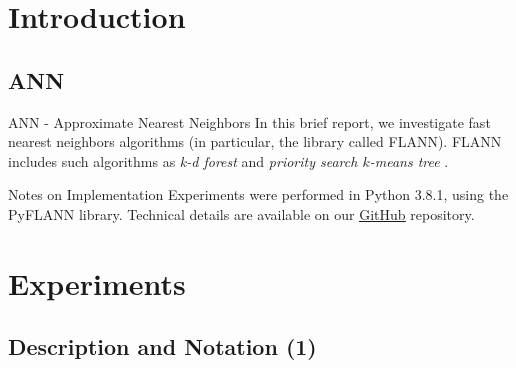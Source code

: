 \section{Introduction}
\subsection{ANN}

\begin{frame}
	
	\begin{block}{ANN - Approximate Nearest Neighbors}
		In this brief report, we investigate fast nearest neighbors algorithms (in particular, the library called FLANN). FLANN includes such algorithms as {\color{red} \textit{k-d forest}} and {\color{red} \textit{priority search $k$-means tree}} \cite{Muja2009}. 
	\end{block}
	
	\begin{block}{Notes on Implementation}
		Experiments were performed in Python 3.8.1, using the PyFLANN library. Technical details are available on our  \href{https://github.com/salisaresama/computer-vision/blob/flann-32k/flann.ipynb}{{\color{blue} \underline{GitHub}}} repository.
	\end{block}
	
\end{frame}


\section{Experiments}
\subsection{Description and Notation (1)}

